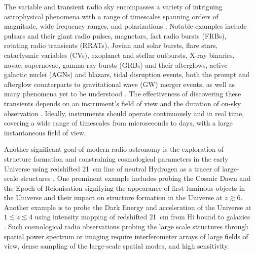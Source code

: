 \documentclass[
  journal=pasa,
  manuscript=article-type,
  year=2020,
  volume=37,
]{cup-journal}
\begin{document}
The variable and transient radio sky encompasses a variety of intriguing astrophysical phenomena with a range of timescales spanning orders of magnitude, wide frequency ranges, and polarizations \citep[][and references therein]{Pietka+2015,Chandra+2016,Nimmo+2022}. Notable examples include pulsars and their giant radio pulses, magnetars, fast radio bursts (FRBs), rotating radio transients (RRATs), Jovian and solar bursts, flare stars, cataclysmic variables (CVs), exoplanet and stellar outbursts, X-ray binaries, novae, supernovae, gamma-ray bursts (GRBs) and their afterglows, active galactic nuclei (AGNs) and blazars, tidal disruption events, both the prompt and afterglow counterparts to gravitational wave (GW) merger events, as well as many phenomena yet to be understood \citep{Lorimer+2007,Thyagarajan+2011,Keane2013,Thornton+2013,Bochenek+2020}. The effectiveness of discovering these transients depends on an instrument's field of view and the duration of on-sky observation \citep{Cordes2007}. Ideally, instruments should operate continuously and in real time, covering a wide range of timescales from microseconds to days, with a large instantaneous field of view. 

Another significant goal of modern radio astronomy is the exploration of structure formation and constraining cosmological parameters in the early Universe using redshifted 21~cm line of neutral Hydrogen as a tracer of large-scale structures \citep[][and references therein]{Morales+2010,Pritchard+2012}. One prominent example includes probing the Cosmic Dawn and the Epoch of Reionisation signifying the appearance of first luminous objects in the Universe and their impact on structure formation in the Universe at $z\gtrsim 6$. Another example is to probe the Dark Energy and acceleration of the Universe at $1\lesssim z\lesssim 4$ using intensity mapping of redshifted 21~cm from H{\sc i} bound to galaxies \citep{CosmicVisions+2018}. Such cosmological radio observations probing the large scale structures through spatial power spectrum or imaging require interferometer arrays of large fields of view, dense sampling of the large-scale spatial modes, and high sensitivity. 
\end{document}
